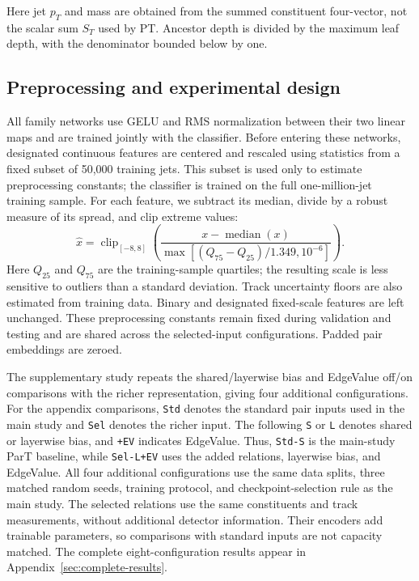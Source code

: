 Here jet $p_T$ and mass are obtained from the summed constituent four-vector,
not the scalar sum $S_T$ used by PT. Ancestor depth is divided by the maximum
leaf depth, with the denominator bounded below by one.

\subsection{Preprocessing and experimental design}
\label{sec:richer-setup}

All family networks use GELU and RMS normalization between their two linear
maps and are trained jointly with the classifier. Before entering these
networks, designated continuous features are centered and rescaled using
statistics from a fixed subset of 50,000 training jets. This subset is used
only to estimate preprocessing constants; the classifier is trained on the
full one-million-jet training sample. For each feature, we subtract its median,
divide by a robust measure of its spread, and clip extreme values:
\begin{equation}
 \widehat x=\operatorname{clip}_{[-8,8]}
 \left(\frac{x-\operatorname{median}(x)}
 {\max[(Q_{75}-Q_{25})/1.349,10^{-6}]}\right).
 \label{eq:relation-normalization}
\end{equation}
Here $Q_{25}$ and $Q_{75}$ are the training-sample quartiles; the resulting
scale is less sensitive to outliers than a standard deviation. Track
uncertainty floors are also estimated from training data. Binary and
designated fixed-scale features are left unchanged. These preprocessing
constants remain fixed during validation and testing and are shared across
the selected-input configurations. Padded pair embeddings are zeroed.

The supplementary study repeats the shared/layerwise bias and EdgeValue
off/on comparisons with the richer representation, giving four additional
configurations. For the appendix comparisons, \texttt{Std} denotes the
standard pair inputs used in the main study and \texttt{Sel} denotes the
richer input. The following \texttt{S} or \texttt{L} denotes shared or
layerwise bias, and \texttt{+EV} indicates EdgeValue. Thus, \texttt{Std-S}
is the main-study ParT baseline, while \texttt{Sel-L+EV} uses the added
relations, layerwise bias, and EdgeValue.
All four additional configurations use the same data splits, three matched random seeds,
training protocol, and checkpoint-selection rule as the main study.
The selected relations use the same constituents and track measurements,
without additional detector information. Their encoders add trainable
parameters, so comparisons with standard inputs are not capacity matched.
The complete eight-configuration results appear in
Appendix~\ref{sec:complete-results}.

